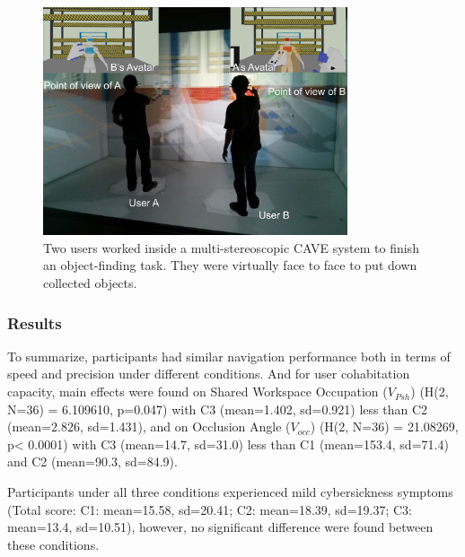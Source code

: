 \begin{figure}[tb]
  \centering
  \includegraphics[width=0.8\textwidth]{figures/3_teaser_exp1}
  \caption{\label{fig:3_teaser_exp1}Two users worked inside a multi-stereoscopic CAVE system to finish an object-finding task. They were virtually face to face to put down collected objects.}
\end{figure}

\subsubsection{Results}
To summarize, participants had similar navigation performance both in terms of speed and precision under different conditions. And for user cohabitation capacity, main effects were found on Shared Workspace Occupation ($V_{Psh}$) (H(2, N=36) = 6.109610, p=0.047) with C3 (mean=1.402, sd=0.921) less than C2 (mean=2.826, sd=1.431), and on Occlusion Angle ($V_{occ}$) (H(2, N=36) = 21.08269, p\textless{} 0.0001) with C3 (mean=14.7, sd=31.0) less than C1 (mean=153.4, sd=71.4) and C2 (mean=90.3, sd=84.9).

Participants under all three conditions experienced mild cybersickness symptoms (Total score: C1: mean=15.58, sd=20.41; C2: mean=18.39, sd=19.37; C3: mean=13.4, sd=10.51), however, no significant difference were found between these conditions.


